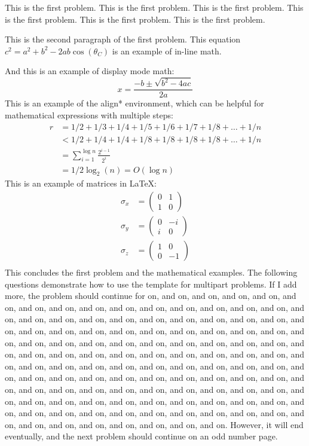 \documentclass{cisXXX} %
\begin{document}
\maketitle
\HWproblem
This is the first problem.
This is the first problem.
This is the first problem.
This is the first problem.
This is the first problem.
This is the first problem.

This is the second paragraph of the first problem. This equation $c^2 = a^2 + b^2 - 2ab \cos(\theta_C)$ is an example of in-line math.

And this is an example of display mode math:
$$x = \frac{-b \pm \sqrt{b^2 - 4ac}}{2a}$$
This is an example of the align* environment, which can be helpful for mathematical expressions with multiple steps:
\begin{align*}
r &= 1/2 + 1/3 + 1/4 + 1/5 + 1/6 + 1/7 + 1/8 + \ldots + 1/n\\
&< 1/2 + 1/4 + 1/4 + 1/8 + 1/8 + 1/8 + 1/8 + \ldots + 1/n\\
&= \sum_{i = 1}^{\log n} \frac{2^{i - 1}}{2^i}\\
&= 1/2 \log_2 (n) = O(\log n)
\end{align*}
This is an example of matrices in \LaTeX:
\begin{align*}
	\sigma_x &=
		\begin{pmatrix}
		0 & 1 \\
		1 & 0
		\end{pmatrix} \\
	\sigma_y &=
		\begin{pmatrix}
		0 & -i \\
		i & 0
		\end{pmatrix} \\
	\sigma_z &=
		\begin{pmatrix}
		1 & 0 \\
		0 & -1
		\end{pmatrix} \\
\end{align*}
This concludes the first problem and the mathematical examples. The following questions demonstrate how to use the template for multipart problems.  If I add more, the problem should continue for on, and on, and on, and on, and on, and on, and on, and on, and on, and on, and on, and on, and on, and on, and on, and on, and on, and on, and on, and on, and on, and on, and on, and on, and on, and on, and on, and on, and on, and on, and on, and on, and on, and on, and on, and on, and on, and
on, and on, and on, and on, and on, and on, and on, and on, and on, and on, and on, and on, and on, and on, and on, and on, and on, and on, and on, and on, and on, and on, and on, and on, and on, and on, and on, and on, and on, and on, and on, and on, and on, and on, and on, and on, and on, and on, and on, and on, and on, and on, and on, and on, and on, and on, and on, and on, and on, and on, and on, and on, and on, and on, and on, and on, and on, and on, and on, and on, and on, and on,
and on, and on, and on, and on, and on, and on, and on, and on, and on, and on, and on, and on, and on, and on.
\newline\newline However, it will end eventually, and the next problem should continue on an odd number page. 
\end{document}
